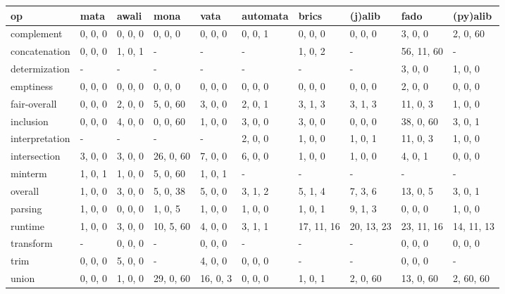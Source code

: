 \begin{tabular}{llllllllll}
\hline
 op             & mata    & awali   & mona      & vata     & automata   & brics      & (j)alib    & fado       & (py)alib   \\
\hline
 complement     & 0, 0, 0 & 0, 0, 0 & 0, 0, 0   & 0, 0, 0  & 0, 0, 1    & 0, 0, 0    & 0, 0, 0    & 3, 0, 0    & 2, 0, 60   \\
 concatenation  & 0, 0, 0 & 1, 0, 1 & -         & -        & -          & 1, 0, 2    & -          & 56, 11, 60 & -          \\
 determization  & -       & -       & -         & -        & -          & -          & -          & 3, 0, 0    & 1, 0, 0    \\
 emptiness      & 0, 0, 0 & 0, 0, 0 & 0, 0, 0   & 0, 0, 0  & 0, 0, 0    & 0, 0, 0    & 0, 0, 0    & 2, 0, 0    & 0, 0, 0    \\
 fair-overall   & 0, 0, 0 & 2, 0, 0 & 5, 0, 60  & 3, 0, 0  & 2, 0, 1    & 3, 1, 3    & 3, 1, 3    & 11, 0, 3   & 1, 0, 0    \\
 inclusion      & 0, 0, 0 & 4, 0, 0 & 0, 0, 60  & 1, 0, 0  & 3, 0, 0    & 3, 0, 0    & 0, 0, 0    & 38, 0, 60  & 3, 0, 1    \\
 interpretation & -       & -       & -         & -        & 2, 0, 0    & 1, 0, 0    & 1, 0, 1    & 11, 0, 3   & 1, 0, 0    \\
 intersection   & 3, 0, 0 & 3, 0, 0 & 26, 0, 60 & 7, 0, 0  & 6, 0, 0    & 1, 0, 0    & 1, 0, 0    & 4, 0, 1    & 0, 0, 0    \\
 minterm        & 1, 0, 1 & 1, 0, 0 & 5, 0, 60  & 1, 0, 1  & -          & -          & -          & -          & -          \\
 overall        & 1, 0, 0 & 3, 0, 0 & 5, 0, 38  & 5, 0, 0  & 3, 1, 2    & 5, 1, 4    & 7, 3, 6    & 13, 0, 5   & 3, 0, 1    \\
 parsing        & 1, 0, 0 & 0, 0, 0 & 1, 0, 5   & 1, 0, 0  & 1, 0, 0    & 1, 0, 1    & 9, 1, 3    & 0, 0, 0    & 1, 0, 0    \\
 runtime        & 1, 0, 0 & 3, 0, 0 & 10, 5, 60 & 4, 0, 0  & 3, 1, 1    & 17, 11, 16 & 20, 13, 23 & 23, 11, 16 & 14, 11, 13 \\
 transform      & -       & 0, 0, 0 & -         & 0, 0, 0  & -          & -          & -          & 0, 0, 0    & 0, 0, 0    \\
 trim           & 0, 0, 0 & 5, 0, 0 & -         & 4, 0, 0  & 0, 0, 0    & -          & -          & 0, 0, 0    & -          \\
 union          & 0, 0, 0 & 1, 0, 0 & 29, 0, 60 & 16, 0, 3 & 0, 0, 0    & 1, 0, 1    & 2, 0, 60   & 13, 0, 60  & 2, 60, 60  \\
\hline
\end{tabular}